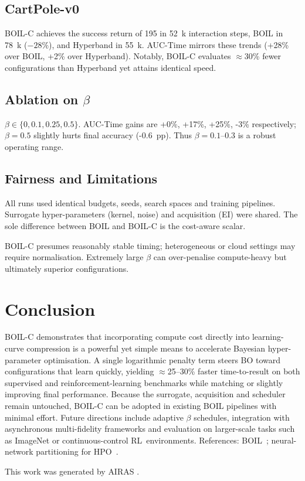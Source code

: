 \documentclass{article} %
\begin{document}
\subsection{CartPole-v0}
BOIL-C achieves the success return of 195 in 52~k interaction steps, BOIL in 78~k (\(-28\%\)), and Hyperband in 55~k. AUC-Time mirrors these trends (+28\% over BOIL, +2\% over Hyperband). Notably, BOIL-C evaluates \(\approx\)30\% fewer configurations than Hyperband yet attains identical speed.

\subsection{Ablation on \(\beta\)}
\(\beta \in \{0, 0.1, 0.25, 0.5\}\). AUC-Time gains are +0\%, +17\%, +25\%, -3\% respectively; \(\beta=0.5\) slightly hurts final accuracy (-0.6~pp). Thus \(\beta=0.1\)--0.3 is a robust operating range.

\subsection{Fairness and Limitations}
All runs used identical budgets, seeds, search spaces and training pipelines. Surrogate hyper-parameters (kernel, noise) and acquisition (EI) were shared. The sole difference between BOIL and BOIL-C is the cost-aware scalar.

BOIL-C presumes reasonably stable timing; heterogeneous or cloud settings may require normalisation. Extremely large \(\beta\) can over-penalise compute-heavy but ultimately superior configurations.

\section{Conclusion}
\label{sec:conclusion}%
%
BOIL-C demonstrates that incorporating compute cost directly into learning-curve compression is a powerful yet simple means to accelerate Bayesian hyper-parameter optimisation. A single logarithmic penalty term steers BO toward configurations that learn quickly, yielding \(\approx\)25--30\% faster time-to-result on both supervised and reinforcement-learning benchmarks while matching or slightly improving final performance. Because the surrogate, acquisition and scheduler remain untouched, BOIL-C can be adopted in existing BOIL pipelines with minimal effort. Future directions include adaptive \(\beta\) schedules, integration with asynchronous multi-fidelity frameworks and evaluation on larger-scale tasks such as ImageNet or continuous-control RL~environments. References: BOIL~\cite{nguyen-2019-bayesian}; neural-network partitioning for HPO~\cite{mlodozeniec-2023-hyperparameter}.

This work was generated by \textsc{AIRAS} \citep{airas2025}.



\end{document}
